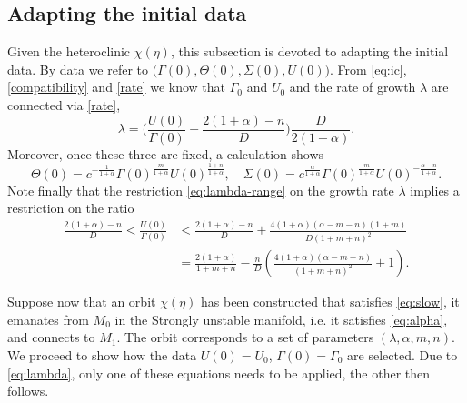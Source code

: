 \documentclass[usletter,11pt]{article}
\theoremstyle{remark}
\begin{document}
\subsection{Adapting the initial data } \label{sec:twoparam}
Given the heteroclinic $\chi(\eta)$, this subsection is devoted to adapting the initial data. By  data we refer to 
$\big(\Gamma(0),\Theta(0),\Sigma(0),U(0)\big)$. From \eqref{eq:ic}, \eqref{compatibility} and \eqref{rate} we know
that  $\Gamma_0$ and $U_0$ and the rate of growth $\lambda$ are connected via \eqref{rate},
\begin{equation} \label{eq:lambda}
 \lambda = \Big(\frac{U(0)}{\Gamma(0)} - \frac{2(1+\alpha)-n}{D}\Big)\frac{D}{2(1+\alpha)}.
\end{equation}
Moreover, once these three are fixed, a calculation shows 
$$\Theta(0) = c^{-\frac{1}{1+\alpha}}\Gamma(0)^{\frac{m}{1+\alpha}} U(0)^{\frac{1+n}{1+\alpha}}, \quad \Sigma(0) = c^{\frac{\alpha}{1+\alpha}}\Gamma(0)^{\frac{m}{1+\alpha}} U(0)^{-\frac{\alpha-n}{1+\alpha}}.$$
Note finally that the restriction \eqref{eq:lambda-range} on the growth rate $\lambda$ implies a restriction on the ratio
\begin{equation} \label{eq:restriction}
\begin{aligned}
 \frac{2(1+\alpha) -n}{D} < \frac{U(0)}{\Gamma(0)} &< \frac{2(1+\alpha) -n}{D} + \frac{4(1+\alpha)(\alpha-m-n)(1+m)}{D(1+m+n)^2}\\
 &=\frac{2(1+\alpha)}{1+m+n} -\frac{n}{D}\left( \frac{4(1+\alpha)(\alpha-m-n)}{(1+m+n)^2} +1\right).
\end{aligned}
\end{equation}





Suppose now that an orbit $\chi(\eta)$ has been constructed that satisfies \eqref{eq:slow}, it emanates from $M_0$ in the Strongly unstable manifold, i.e. it satisfies \eqref{eq:alpha},
and connects to $M_1$. The orbit corresponds to a set of parameters $(\lambda, \alpha, m,n)$. We proceed to show how the data $U(0) = U_0$, $\Gamma(0) = \Gamma_0$ are selected.
Due to \eqref{eq:lambda}, only one of these equations needs to be applied, the other then follows.
\end{document}
